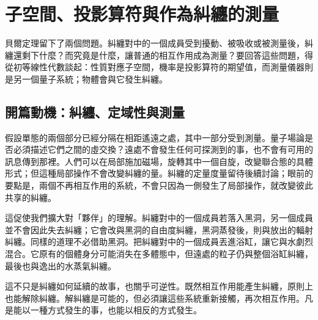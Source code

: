 \chapter{子空間、投影算符與作為糾纏的測量}

貝爾定理留下了兩個問題。糾纏對中的一個成員受到擾動、被吸收或被測量後，糾纏還剩下什麼？而究竟是什麼，讓普通的相互作用成為測量？要回答這些問題，得從初等線性代數談起：性質對應子空間，機率是投影算符的期望值，而測量儀器則是另一個量子系統；物體會與它發生糾纏。

\section{開篇動機：糾纏、定域性與測量}

假設單態的兩個部分已經分隔在相距遙遠之處，其中一部分受到測量。量子場論是否必須描述它們之間的虛交換？遠處不會發生任何可探測到的事，也不會有可用的訊息傳到那裡。人們可以在局部施加磁場，旋轉其中一個自旋，改變聯合態的具體形式；但這種局部操作不會改變糾纏的量。糾纏的定量度量留待後續討論；眼前的要點是，兩個不再相互作用的系統，不會只因為一側發生了局部操作，就改變彼此共享的糾纏。

\begin{classroomqa}
\end{classroomqa}

這促使我們擴大對「夥伴」的理解。糾纏對中的一個成員若落入黑洞，另一個成員並不會因此失去糾纏；它會改與黑洞的自由度糾纏，黑洞蒸發後，則與放出的輻射糾纏。同樣的道理不必借助黑洞。把糾纏對中的一個成員丟進浴缸，讓它與水劇烈混合。它原有的個體身分可能消失在多體態中，但遠處的粒子仍與整個浴缸糾纏，最後也與逸出的水蒸氣糾纏。

這不只是糾纏如何延續的故事，也關乎可逆性。既然相互作用能產生糾纏，原則上也能解除糾纏。解糾纏是可能的，但必須讓這些系統重新接觸，再次相互作用。凡是能以一種方式發生的事，也能以相反的方式發生。

\begin{classroomqa}
\end{classroomqa}

